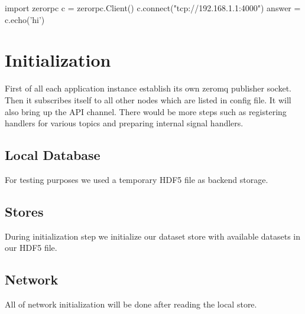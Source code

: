 \begin{python}
import zerorpc
c = zerorpc.Client()
c.connect("tcp://192.168.1.1:4000")
answer = c.echo('hi')
\end{python}


\section{Initialization}
First of all each application instance establish its own zeromq publisher socket. Then it subscribes
itself to all other nodes which are listed in config file. It will also bring up the API channel.
There would be more steps such as registering handlers for various topics and preparing internal
signal handlers.
\subsection{Local Database}
For testing purposes we used a temporary HDF5 file as backend storage.
\subsection{Stores}
During initialization step we initialize our dataset store with available datasets in our HDF5 file.
\subsection{Network}
All of network initialization will be done after reading the local store.


